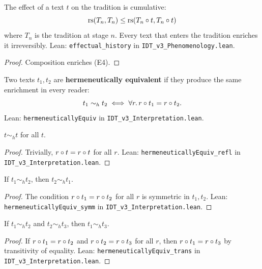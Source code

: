 \begin{theorem}
\label{thm:effectual-history}
The effect of a text $t$ on the tradition is cumulative:
\[
\mathrm{rs}(T_n, T_n) \leq \mathrm{rs}(T_n \circ t, T_n \circ t)
\]
where $T_n$ is the tradition at stage $n$.  Every text that enters the
tradition enriches it irreversibly.
Lean: \texttt{effectual\_history} in \texttt{IDT\_v3\_Phenomenology.lean}.
\end{theorem}

\begin{proof}
Composition enriches (E4).
\end{proof}

\begin{definition}
\label{def:hermeneutic-equiv}
Two texts $t_1, t_2$ are \textbf{hermeneutically equivalent} if they produce
the same enrichment in every reader:
\[
t_1 \sim_h t_2 \iff \forall r.\, r \circ t_1 = r \circ t_2.
\]
Lean: \texttt{hermeneuticallyEquiv} in \texttt{IDT\_v3\_Interpretation.lean}.
\end{definition}

\begin{theorem}
\label{thm:herm-equiv-refl}
$t \sim_h t$ for all $t$.
\end{theorem}

\begin{proof}
Trivially, $r \circ t = r \circ t$ for all $r$.
Lean: \texttt{hermeneuticallyEquiv\_refl} in \texttt{IDT\_v3\_Interpretation.lean}.
\end{proof}

\begin{theorem}
\label{thm:herm-equiv-symm}
If $t_1 \sim_h t_2$, then $t_2 \sim_h t_1$.
\end{theorem}

\begin{proof}
The condition $r \circ t_1 = r \circ t_2$ for all $r$ is symmetric in
$t_1, t_2$.
Lean: \texttt{hermeneuticallyEquiv\_symm} in \texttt{IDT\_v3\_Interpretation.lean}.
\end{proof}

\begin{theorem}
\label{thm:herm-equiv-trans}
If $t_1 \sim_h t_2$ and $t_2 \sim_h t_3$, then $t_1 \sim_h t_3$.
\end{theorem}

\begin{proof}
If $r \circ t_1 = r \circ t_2$ and $r \circ t_2 = r \circ t_3$
for all $r$, then $r \circ t_1 = r \circ t_3$ by transitivity of equality.
Lean: \texttt{hermeneuticallyEquiv\_trans} in \texttt{IDT\_v3\_Interpretation.lean}.
\end{proof}

